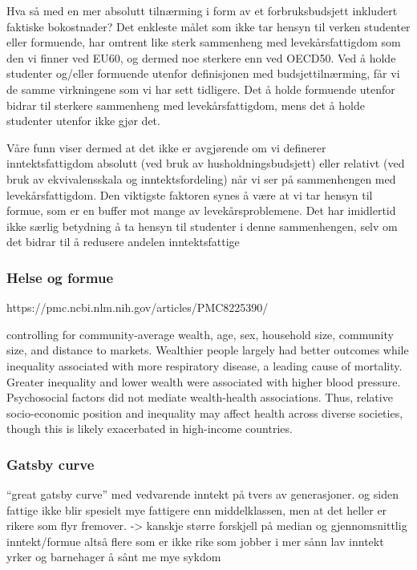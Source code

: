 \documentclass[
  12pt,
  a4paper,
  DIV=11,
  numbers=noendperiod]{scrartcl}
\begin{document}
Hva så med en mer absolutt tilnærming i form av et forbruksbudsjett
inkludert faktiske bokostnader? Det enkleste målet som ikke tar hensyn
til verken studenter eller formuende, har omtrent like sterk sammenheng
med levekårsfattigdom som den vi finner ved EU60, og dermed noe sterkere
enn ved OECD50. Ved å holde studenter og/eller formuende utenfor
definisjonen med budsjettilnærming, får vi de samme virkningene som vi
har sett tidligere. Det å holde formuende utenfor bidrar til sterkere
sammenheng med levekårsfattigdom, mens det å holde studenter utenfor
ikke gjør det.

Våre funn viser dermed at det ikke er avgjørende om vi definerer
inntektsfattigdom absolutt (ved bruk av husholdningsbudsjett) eller
relativt (ved bruk av ekvivalensskala og inntektsfordeling) når vi ser
på sammenhengen med levekårsfattigdom. Den viktigste faktoren synes å
være at vi tar hensyn til formue, som er en buffer mot mange av
levekårsproblemene. Det har imidlertid ikke særlig betydning å ta hensyn
til studenter i denne sammenhengen, selv om det bidrar til å redusere
andelen inntektsfattige

\subsubsection{Helse og formue}\label{helse-og-formue}

https://pmc.ncbi.nlm.nih.gov/articles/PMC8225390/

controlling for community-average wealth, age, sex, household size,
community size, and distance to markets. Wealthier people largely had
better outcomes while inequality associated with more respiratory
disease, a leading cause of mortality. Greater inequality and lower
wealth were associated with higher blood pressure. Psychosocial factors
did not mediate wealth-health associations. Thus, relative
socio-economic position and inequality may affect health across diverse
societies, though this is likely exacerbated in high-income countries.

\subsubsection{Gatsby curve}\label{gatsby-curve}

``great gatsby curve'' med vedvarende inntekt på tvers av generasjoner.
og siden fattige ikke blir spesielt mye fattigere enn middelklassen, men
at det heller er rikere som flyr fremover. -\textgreater{} kanskje
større forskjell på median og gjennomsnittlig inntekt/formue altså flere
som er ikke rike som jobber i mer sånn lav inntekt yrker og barnehager å
sånt me mye sykdom
\end{document}
